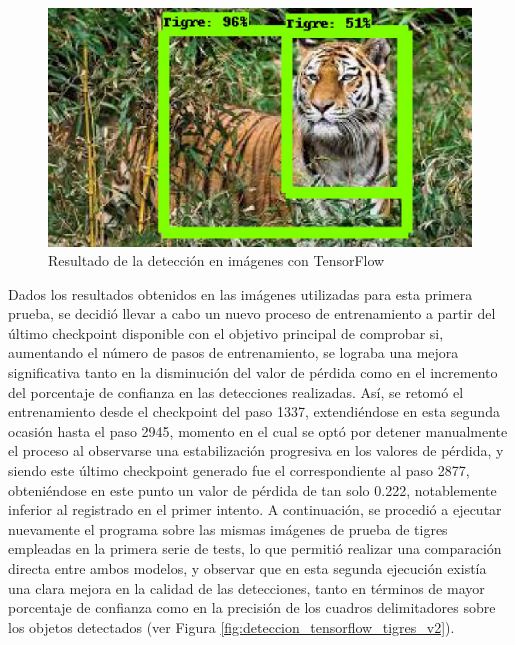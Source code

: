 \begin{figure}[H]
\begin{minipage}{0.46\textwidth}
  \end{minipage}
  \hspace{2mm}
  \begin{minipage}{0.46\textwidth}
    \centering
    \includegraphics[width=\linewidth]{figs/tigre_5.jpeg}
  \end{minipage}
  \caption{Resultado de la detección en imágenes con TensorFlow}
  \label{fig:deteccion_tensorflow_tigres}
  \end{figure}
 
Dados los resultados obtenidos en las imágenes utilizadas para esta primera prueba, se decidió llevar a cabo un nuevo proceso de entrenamiento a partir del último checkpoint disponible con el objetivo principal de comprobar si, aumentando el número de pasos de entrenamiento, se lograba una mejora significativa tanto en la disminución del valor de pérdida como en el incremento del porcentaje de confianza en las detecciones realizadas. Así, se retomó el entrenamiento desde el checkpoint del paso 1337, extendiéndose en esta segunda ocasión hasta el paso 2945, momento en el cual se optó por detener manualmente el proceso al observarse una estabilización progresiva en los valores de pérdida, y siendo este último checkpoint generado fue el correspondiente al paso 2877, obteniéndose en este punto un valor de pérdida de tan solo 0.222, notablemente inferior al registrado en el primer intento. A continuación, se procedió a ejecutar nuevamente el programa sobre las mismas imágenes de prueba de tigres empleadas en la primera serie de tests, lo que permitió realizar una comparación directa entre ambos modelos, y observar que en esta segunda ejecución existía una clara mejora en la calidad de las detecciones, tanto en términos de mayor porcentaje de confianza como en la precisión de los cuadros delimitadores sobre los objetos detectados (ver Figura \ref{fig:deteccion_tensorflow_tigres_v2}).

